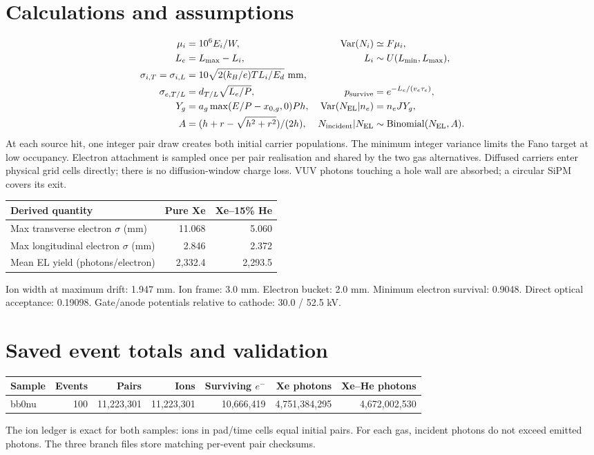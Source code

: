 \documentclass[11pt]{article}
\begin{document}
\section*{Calculations and assumptions}
\begin{align*}
\mu_i &= 10^6 E_i/W, &\operatorname{Var}(N_i)&\simeq F\mu_i,\\
L_e &= L_{\max}-L_i, & L_i&\sim U(L_{\min},L_{\max}),\\
\sigma_{i,T}=\sigma_{i,L}&=10\sqrt{2(k_B/e)TL_i/E_d}\ {\rm mm},\\
\sigma_{e,T/L}&=d_{T/L}\sqrt{L_e/P}, &p_{\rm survive}&=e^{-L_e/(v_e\tau_e)},\\
Y_g&=a_g\max(E/P-x_{0,g},0)Ph, &\operatorname{Var}(N_{\rm EL}|n_e)&=n_e JY_g,\\
A&=(h+r-\sqrt{h^2+r^2})/(2h), &N_{\rm incident}|N_{\rm EL}&\sim\mathrm{Binomial}(N_{\rm EL},A).
\end{align*}
At each source hit, one integer pair draw creates both initial carrier populations. The minimum integer variance limits the Fano target at low occupancy. Electron attachment is sampled once per pair realisation and shared by the two gas alternatives. Diffused carriers enter physical grid cells directly; there is no diffusion-window charge loss. VUV photons touching a hole wall are absorbed; a circular SiPM covers its exit.
\par\medskip
\begin{tabular}{lrr}\toprule Derived quantity & Pure Xe & Xe--15\% He\\\midrule
Max transverse electron $\sigma$ (mm) & 11.068 & 5.060\\
Max longitudinal electron $\sigma$ (mm) & 2.846 & 2.372\\
Mean EL yield (photons/electron) & 2,332.4 & 2,293.5\\
\bottomrule\end{tabular}
\par Ion width at maximum drift: 1.947 mm. Ion frame: 3.0 mm. Electron bucket: 2.0 mm. Minimum electron survival: 0.9048. Direct optical acceptance: 0.19098. Gate/anode potentials relative to cathode: 30.0 / 52.5 kV.
\section*{Saved event totals and validation}
\begin{tabular}{lrrrrrr}\toprule Sample & Events & Pairs & Ions & Surviving $e^-$ & Xe photons & Xe--He photons\\\midrule
bb0nu & 100 & 11,223,301 & 11,223,301 & 10,666,419 & 4,751,384,295 & 4,672,002,530\\
\bottomrule\end{tabular}
\par The ion ledger is exact for both samples: ions in pad/time cells equal initial pairs. For each gas, incident photons do not exceed emitted photons. The three branch files store matching per-event pair checksums.
\end{document}
